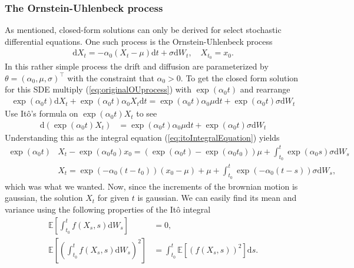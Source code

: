 \subsubsection{The Ornstein-Uhlenbeck process}
As mentioned, closed-form solutions can only be derived for select stochastic differential equations. One such process is the Ornstein-Uhlenbeck process
\begin{align}
    \mathrm{d}X_t = -\alpha_0\left(X_t - \mu\right)\mathrm{d}t + \sigma \mathrm{d}W_t, \quad X_{t_0} = x_0. \label{eq:originalOUprocess}
\end{align}
In this rather simple process the drift and diffusion are parameterized by $\theta = \left(\alpha_0, \mu, \sigma\right)^\top$ with the constraint that $\alpha_0>0$.
To get the closed form solution for this SDE multiply (\ref{eq:originalOUprocess}) with $\exp\left(\alpha_0 t\right)$ and rearrange
\begin{align}
    \exp\left(\alpha_0 t\right)\mathrm{d}X_t + \exp\left(\alpha_0 t\right) \alpha_0 X_t \mathrm{d}t = \exp\left(\alpha_0 t\right)\alpha_0\mu \mathrm{d}t + \exp\left(\alpha_0 t\right)\sigma \mathrm{d}W_t
\end{align}
Use Itô's formula on $\exp\left(\alpha_0 t\right)X_t$ to see
\begin{align}
    \mathrm{d}\left(\exp\left(\alpha_0 t\right)X_t\right) &= \exp\left(\alpha_0 t\right)\alpha_0 \mu \mathrm{d}t + \exp\left(\alpha_0 t\right) \sigma \mathrm{d}W_t \nonumber
\end{align}
Understanding this as the integral equation (\ref{eq:itoIntegralEquation}) yields
\begin{align}
    \exp\left(\alpha_0 t\right)&X_t - \exp\left(\alpha_0 t_0\right)x_0 = \left(\exp\left(\alpha_0 t\right) - \exp\left(\alpha_0 t_0\right)\right)\mu + \int_{t_0}^t \exp\left(\alpha_0 s\right)\sigma \mathrm{d}W_s \nonumber \\
    &X_t = \exp\left(-\alpha_0\left(t - t_0\right)\right)\left(x_0 - \mu\right) + \mu + \int_{t_0}^t \exp\left(-\alpha_0 \left(t - s\right)\right)\sigma \mathrm{d}W_s \label{eq:OU_solution},
\end{align}
which was what we wanted. Now, since the increments of the brownian motion is gaussian, the solution $X_t$ for given $t$ is gaussian. We can easily find its mean and variance using the following properties of the Itô integral \cite[theorem 3.2.1 and lemma 3.1.5]{Oksendal2003_yu}
\begin{align}
    \mathbb{E}\left[\int_{t_0}^t f(X_s, s) \mathrm{d}W_s\right] &= 0 \label{eq:meanOfItoIntegral},\\
    \mathbb{E}\left[\left(\int_{t_0}^t f(X_s, s) \mathrm{d}W_s\right)^2\right] &= \int_{t_0}^t \mathbb{E}\left[\left(f(X_s, s)\right)^2\right] \mathrm{d}s. \label{eq:ItoIsometry}
\end{align}
